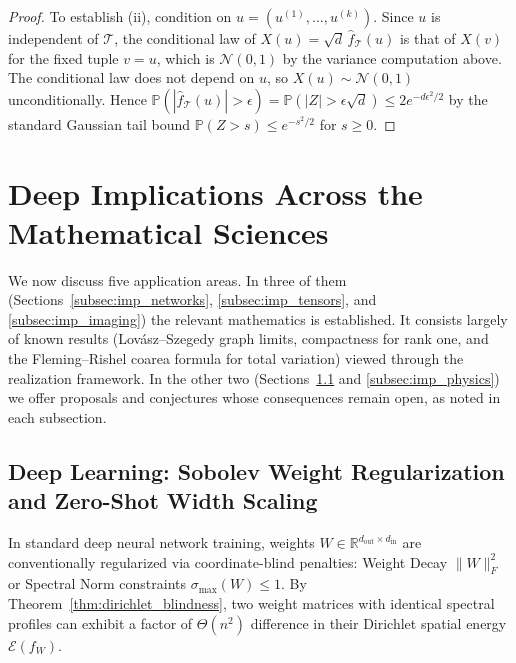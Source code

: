 \documentclass[11pt,a4paper,reqno]{amsart}
\theoremstyle{definition}
\numberwithin{equation}{section}
\providecommand{\R}{\mathbb{R}}
\begin{document}
\begin{proof}
To establish (ii), condition on $u = (u^{(1)}, \dots, u^{(k)})$. Since $u$ is independent of $\mathcal{T}$, the conditional law of $X(u) = \sqrt{d}\,\widehat{f}_{\mathcal{T}}(u)$ is that of $X(v)$ for the fixed tuple $v = u$, which is $\mathcal{N}(0,1)$ by the variance computation above. The conditional law does not depend on $u$, so $X(u) \sim \mathcal{N}(0,1)$ unconditionally. Hence $\mathbb{P}(|\widehat{f}_{\mathcal{T}}(u)| > \epsilon) = \mathbb{P}(|Z| > \epsilon\sqrt{d}) \le 2 e^{-d\epsilon^2/2}$ by the standard Gaussian tail bound $\mathbb{P}(Z > s) \le e^{-s^2/2}$ for $s \ge 0$.
\end{proof}

\section{Deep Implications Across the Mathematical Sciences}
\label{sec:implications}

We now discuss five application areas. In three of them (Sections~\ref{subsec:imp_networks}, \ref{subsec:imp_tensors}, and \ref{subsec:imp_imaging}) the relevant mathematics is established. It consists largely of known results (Lov\'asz--Szegedy graph limits, compactness for rank one, and the Fleming--Rishel coarea formula for total variation) viewed through the realization framework. In the other two (Sections~\ref{subsec:imp_dl} and \ref{subsec:imp_physics}) we offer proposals and conjectures whose consequences remain open, as noted in each subsection.

\subsection{Deep Learning: Sobolev Weight Regularization and Zero-Shot Width Scaling}
\label{subsec:imp_dl}
In standard deep neural network training, weights $W \in \R^{d_{\mathrm{out}} \times d_{\mathrm{in}}}$ are conventionally regularized via coordinate-blind penalties: Weight Decay $\|W\|_F^2$ or Spectral Norm constraints $\sigma_{\max}(W) \le 1$. By Theorem~\ref{thm:dirichlet_blindness}, two weight matrices with identical spectral profiles can exhibit a factor of $\Theta(n^2)$ difference in their Dirichlet spatial energy $\mathcal{E}(f_W)$. 
\end{document}
